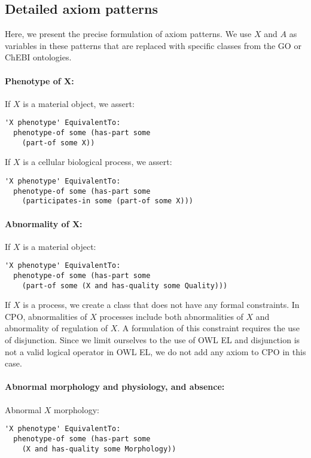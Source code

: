 \documentclass{article}
\begin{document}
\subsection{Detailed axiom patterns}
Here, we present the precise formulation of axiom patterns. We use $X$
and $A$ as variables in these patterns that are replaced with specific
classes from the GO or ChEBI ontologies.

\paragraph{Phenotype of X:}
If $X$ is a material object, we assert:
\begin{verbatim}
'X phenotype' EquivalentTo:
  phenotype-of some (has-part some
    (part-of some X))
\end{verbatim}

If $X$ is a cellular biological process, we assert:
\begin{verbatim}
'X phenotype' EquivalentTo:
  phenotype-of some (has-part some
    (participates-in some (part-of some X)))
\end{verbatim}

\paragraph{Abnormality of X:}
If $X$ is a material object:
\begin{verbatim}
'X phenotype' EquivalentTo:
  phenotype-of some (has-part some
    (part-of some (X and has-quality some Quality)))
\end{verbatim}

If $X$ is a process, we create a class that does not have any formal
constraints. In CPO, abnormalities of $X$ processes include both
abnormalities of $X$ and abnormality of regulation of $X$. A
formulation of this constraint requires the use of disjunction. Since
we limit ourselves to the use of OWL EL and disjunction is not a valid
logical operator in OWL EL, we do not add any axiom to CPO in this case.

\paragraph{Abnormal morphology and physiology, and absence:}
Abnormal $X$ morphology:
\begin{verbatim}
'X phenotype' EquivalentTo:
  phenotype-of some (has-part some
    (X and has-quality some Morphology))
\end{verbatim}
\end{document}
